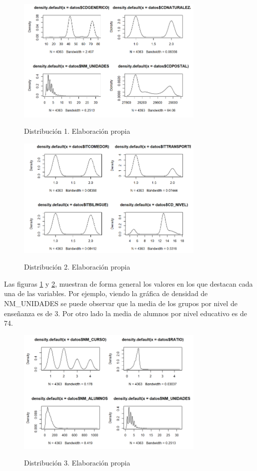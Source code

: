 \begin{subappendices}
\begin{figure}[htb]
	\centering
	\caption{Distribución 1. Elaboración propia}
	\includegraphics[width=0.8\textwidth]{recursos/ImagenesR/norm1}
	\label{fig:norm1}
\end{figure}
\FloatBarrier

\begin{figure}[htb]
	\centering
	\caption{Distribución 2. Elaboración propia}
	\includegraphics[width=0.8\textwidth]{recursos/ImagenesR/norm2}
	\label{fig:norm2}
\end{figure}
\FloatBarrier

Las figuras \ref{fig:norm1} y \ref{fig:norm2}, muestran de forma general los valores en los que destacan cada una de las variables. Por ejemplo, viendo la gráfica de densidad de NM\_UNIDADES se puede observar que la media de los grupos por nivel de enseñanza es de 3. Por otro lado la media de alumnos por nivel educativo es de 74.

\begin{figure}[htb]
	\centering
	\caption{Distribución 3. Elaboración propia}
	\includegraphics[width=0.8\textwidth]{recursos/ImagenesR/norm3}
	\label{fig:norm3}
\end{figure}
\FloatBarrier


\end{subappendices}

